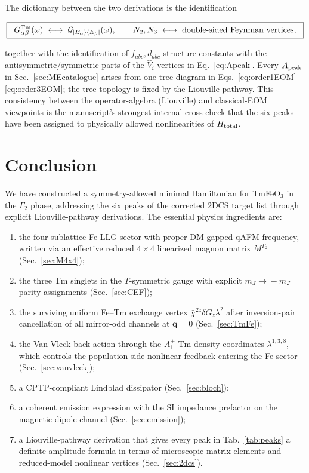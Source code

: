 \documentclass[reprint,amsmath,amssymb,aps,prb,longbibliography]{revtex4-2}
\begin{document}
The dictionary between the two derivations is the identification
\begin{widetext}
\begin{equation}
\boxed{\;\;
G^{\rm Tm}_{\alpha\beta}(\omega)\;\longleftrightarrow\;\mathcal G_{|E_\alpha\rangle\langle E_\beta|}(\omega),\qquad
N_2,N_3\;\longleftrightarrow\;\text{double-sided Feynman vertices},\;\;}
\label{eq:dict}
\end{equation}
\end{widetext}
together with the identification of $f_{abc},d_{abc}$ structure
constants with the antisymmetric/symmetric parts of the
$\hat V_i$ vertices in Eq.~\eqref{eq:Apeak}. Every $A_{\rm peak}$ in
Sec.~\ref{sec:MEcatalogue} arises from one tree diagram in
Eqs.~\eqref{eq:order1EOM}--\eqref{eq:order3EOM}; the tree topology is
fixed by the Liouville pathway. This consistency between the
operator-algebra (Liouville) and classical-EOM viewpoints is the
manuscript's strongest internal cross-check that the six peaks have
been assigned to physically allowed nonlinearities of $H_{\rm total}$.

\section{Conclusion}
\label{sec:conclusion}

We have constructed a symmetry-allowed minimal Hamiltonian for TmFeO$_3$
in the $\Gamma_2$ phase, addressing the six peaks of the corrected 2DCS
target list through explicit Liouville-pathway derivations. The
essential physics ingredients are:
\begin{enumerate}[leftmargin=*]
\item the four-sublattice Fe LLG sector with proper DM-gapped qAFM
frequency, written via an effective reduced $4\times 4$ linearized magnon matrix
$M^{\Gamma_2}$ (Sec.~\ref{sec:M4x4});
\item the three Tm singlets in the $T$-symmetric gauge with explicit
$m_J\!\to\!-m_J$ parity assignments (Sec.~\ref{sec:CEF});
\item the surviving uniform Fe--Tm exchange vertex $\bar\chi^{2z}\delta
G_z\lambda^2$ after inversion-pair cancellation of all mirror-odd channels
at $\mathbf q=0$ (Sec.~\ref{sec:TmFe});
\item the Van Vleck back-action through the $A_1^+$ Tm density
coordinates $\lambda^{1,3,8}$, which controls the population-side
nonlinear feedback entering the Fe sector (Sec.~\ref{sec:vanvleck});
\item a CPTP-compliant Lindblad dissipator (Sec.~\ref{sec:bloch});
\item a coherent emission expression with the SI impedance prefactor on
the magnetic-dipole channel (Sec.~\ref{sec:emission});
\item a Liouville-pathway derivation that gives every peak in
Tab.~\ref{tab:peaks} a definite amplitude formula in terms of microscopic
matrix elements and reduced-model nonlinear vertices (Sec.~\ref{sec:2dcs}).
\end{enumerate}
\end{document}
